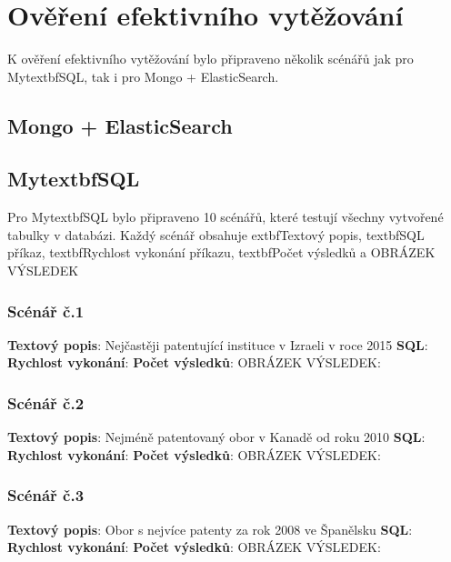 \chapter{Ověření efektivního vytěžování}
K ověření efektivního vytěžování bylo připraveno několik scénářů jak pro Mytextbf{SQL}, tak i pro Mongo + ElasticSearch.
\section{Mongo + ElasticSearch}
\section{Mytextbf{SQL}}
Pro Mytextbf{SQL} bylo připraveno 10 scénářů, které testují všechny vytvořené tabulky v databázi. Každý scénář obsahuje 	extbf{Textový popis}, textbf{SQL} příkaz, textbf{Rychlost vykonání} příkazu, textbf{Počet výsledků} a OBRÁZEK VÝSLEDEK

\subsection{Scénář č.1}
\textbf{Textový popis}: Nejčastěji patentující instituce v Izraeli v roce 2015
\newline
\textbf{SQL}: 
\newline
\textbf{Rychlost vykonání}: 
\newline
\textbf{Počet výsledků}:
\newline
OBRÁZEK VÝSLEDEK:


\subsection{Scénář č.2}
\textbf{Textový popis}: Nejméně patentovaný obor v Kanadě od roku 2010
\newline
\textbf{SQL}: 
\newline
\textbf{Rychlost vykonání}: 
\newline
\textbf{Počet výsledků}:
\newline
OBRÁZEK VÝSLEDEK:

\subsection{Scénář č.3}
\textbf{Textový popis}: Obor s nejvíce patenty za rok 2008 ve Španělsku
\newline
\textbf{SQL}: 
\newline
\textbf{Rychlost vykonání}: 
\newline
\textbf{Počet výsledků}:
\newline
OBRÁZEK VÝSLEDEK:

